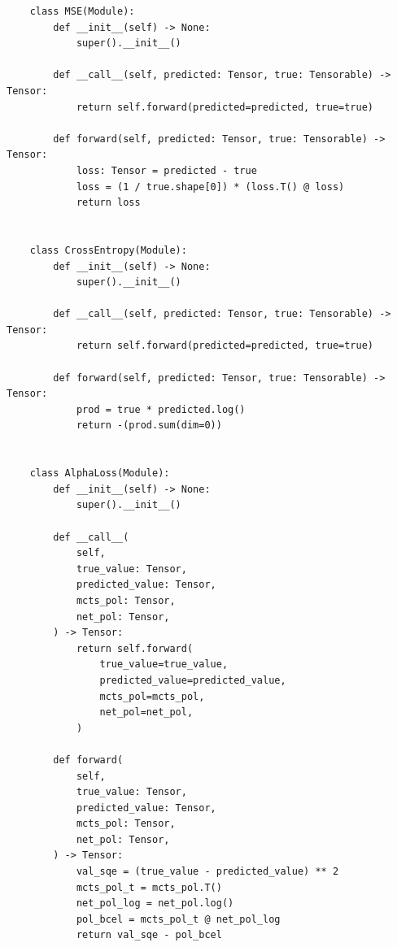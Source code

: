 \documentclass{article}
\begin{document}
\begin{verbatim}
    class MSE(Module):
        def __init__(self) -> None:
            super().__init__()

        def __call__(self, predicted: Tensor, true: Tensorable) -> Tensor:
            return self.forward(predicted=predicted, true=true)

        def forward(self, predicted: Tensor, true: Tensorable) -> Tensor:
            loss: Tensor = predicted - true
            loss = (1 / true.shape[0]) * (loss.T() @ loss)
            return loss


    class CrossEntropy(Module):
        def __init__(self) -> None:
            super().__init__()

        def __call__(self, predicted: Tensor, true: Tensorable) -> Tensor:
            return self.forward(predicted=predicted, true=true)

        def forward(self, predicted: Tensor, true: Tensorable) -> Tensor:
            prod = true * predicted.log()
            return -(prod.sum(dim=0))


    class AlphaLoss(Module):
        def __init__(self) -> None:
            super().__init__()

        def __call__(
            self,
            true_value: Tensor,
            predicted_value: Tensor,
            mcts_pol: Tensor,
            net_pol: Tensor,
        ) -> Tensor:
            return self.forward(
                true_value=true_value,
                predicted_value=predicted_value,
                mcts_pol=mcts_pol,
                net_pol=net_pol,
            )

        def forward(
            self,
            true_value: Tensor,
            predicted_value: Tensor,
            mcts_pol: Tensor,
            net_pol: Tensor,
        ) -> Tensor:
            val_sqe = (true_value - predicted_value) ** 2
            mcts_pol_t = mcts_pol.T()
            net_pol_log = net_pol.log()
            pol_bcel = mcts_pol_t @ net_pol_log
            return val_sqe - pol_bcel

    \end{verbatim}
\end{document}
